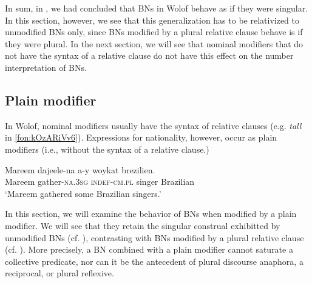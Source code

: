 \documentclass[output=paper]{langscibook}
\begin{document}
			\z
		\ex
	    \label{fon:kOzARiVv6GaPpe}
					\label{fon:kOzARiVv6}
			\z
		\z
		
\noindent In sum, in , we had concluded that BNs in Wolof behave as if they were singular. In this section, however, we see that this generalization has to be relativized to unmodified BNs only, since BNs modified by a plural relative clause behave is if they were plural. In the next section, we will see that nominal modifiers that do not have the syntax of a relative clause do not have this effect on the number interpretation of BNs.

\subsection{Plain modifier}\largerpage
\label{fon:sec:BreZ}

In Wolof, nominal modifiers usually have the syntax of relative clauses (e.g. \textit{tall} in \ref{fon:kOzARiVv6}). Expressions for nationality, however, occur as plain modifiers (i.e., without the syntax of a relative clause.)
		
		\ea \gll	Mareem dajeele-na a-y woykat {brezilien}.\\
				Mareem gather-\textsc{na.3sg} \textsc{indef-cm.pl} singer Brazilian\\
				\glt `Mareem gathered some Brazilian singers.'\label{fon:gEntToRrRSeAa3}
		\z
		
	
	
	\noindent In this section, we will examine the behavior of BNs when modified by a plain modifier. We will see that they retain the singular construal exhibitted by unmodified BNs (cf. ), contrasting with BNs modified by a plural relative clause (cf. ). More precisely, a BN combined with a plain modifier cannot saturate a collective predicate, nor can it be the antecedent of plural discourse anaphora, a reciprocal, or plural reflexive.
	
\end{document}
